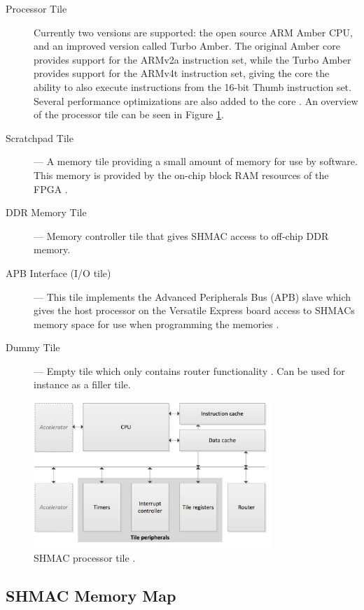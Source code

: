 \begin{description}
  \item[Processor Tile] Currently two versions are supported: the open source ARM Amber CPU, and an improved version called Turbo Amber.
  	The original Amber core provides support for the ARMv2a instruction set, while the Turbo Amber
	provides support for the ARMv4t instruction set, giving the core the ability to also execute
	instructions from the 16-bit Thumb instruction set. Several performance optimizations are
	also added to the core \cite{turboamber}. An overview of the processor tile can be seen in
	Figure \ref{fig:shmac-cpu}.
  \item[Scratchpad Tile] --- A memory tile providing a small amount of memory for use by software.
  	This memory is provided by the on-chip block RAM resources of the FPGA \cite{shmac-plan}.
  \item[DDR Memory Tile] --- Memory controller tile that gives SHMAC access to off-chip DDR memory.
  \item[APB Interface (I/O tile)] --- This tile implements the Advanced Peripherals Bus (APB) slave
  	which gives the host processor on the Versatile Express board access to SHMACs memory space
	for use when programming the memories \cite{shmac-plan}.
  \item[Dummy Tile] --- Empty tile which only contains router functionality \cite{shmac-plan}. Can be used for instance
  	as a filler tile.
\end{description}

\begin{figure}[htb]
    \centering
    \includegraphics[width=0.8\textwidth]{Figures/Heterogeneous/SHMACCPU}
    \caption{SHMAC processor tile \cite{shmac-plan}.}
    \label{fig:shmac-cpu}
\end{figure}

\subsection{SHMAC Memory Map}

